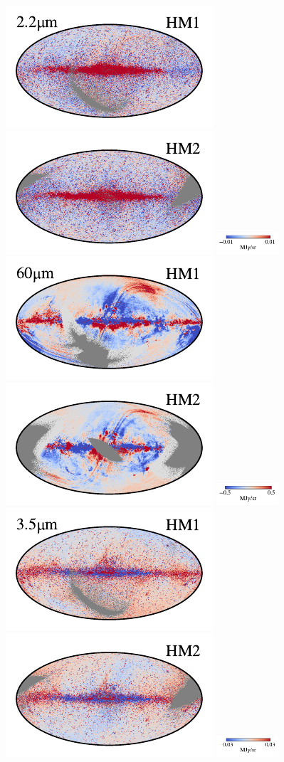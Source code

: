 \documentclass[twocolumn]{aa}
\begin{document}
\begin{figure}[t]
    \includegraphics[width=0.22\linewidth]{figs/compare_res/cosmoglobe_res_02a.pdf}%
    \includegraphics[width=0.22\linewidth]{figs/compare_res/cosmoglobe_res_02b.pdf}%
    \includegraphics[width=23mm,angle=90]{figs/compare_res/cbar_02.pdf}\hspace*{3mm}
    \includegraphics[width=0.22\linewidth]{figs/compare_res/cosmoglobe_res_07a.pdf}%
    \includegraphics[width=0.22\linewidth]{figs/compare_res/cosmoglobe_res_07b.pdf}%
    \includegraphics[width=23mm,angle=90]{figs/compare_res/cbar_07.pdf}\\
    \includegraphics[width=0.22\linewidth]{figs/compare_res/cosmoglobe_res_03a.pdf}%
    \includegraphics[width=0.22\linewidth]{figs/compare_res/cosmoglobe_res_03b.pdf}%
    \includegraphics[width=23mm,angle=90]{figs/compare_res/cbar_03.pdf}\hspace*{3mm}

\end{figure}
\end{document}
